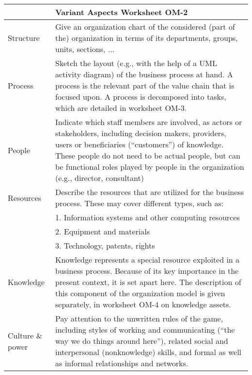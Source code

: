 \begin{tabular}%
       {|>{\colleft}p{3cm}%
        |>{\colleft}p{8.5cm}|}
\hline
{\bf Organization Model} &
   {\bf Variant Aspects Worksheet OM-2} \\
\hline
\hline
\sc Structure &
   {\rm
   Give an organization chart of the considered (part of the) organization
   in terms of its departments, groups, units, sections, ...
   } \\
\hline
\sc Process &
   {\rm
   Sketch the layout (e.g., with the help of a UML activity diagram) 
   of the business
   process at hand. A process is the relevant part of the value
   chain that is focused upon. A process is
   decomposed into tasks, which are detailed in worksheet OM-3.
   } \\
\hline
\sc People &
   {\rm
   Indicate which staff members are involved, as actors or
   stakeholders, including decision makers, providers, users or
   beneficiaries (``customers'') of knowledge. These people do not need
   to be actual people, but can be functional roles played by people in
   the organization (e.g., director, consultant)
   } \\
\hline
\sc Resources &
   {\rm
   Describe the resources that are utilized for the business
   process. These may cover different types, such as:
   } \\
 & {\rm 1. Information systems and other computing resources} \\
 & {\rm 2. Equipment and materials} \\
 & {\rm 3. Technology, patents, rights} \\
\hline
\sc Knowledge &
   {\rm
   Knowledge represents a special resource exploited in a business
   process. Because of its key importance in the present context, it
   is set apart here. The description of this component of the
   organization model is given separately, in worksheet OM-4 on
   knowledge assets.
   } \\
\hline
\sc Culture \& power &
   {\rm
   Pay attention to the unwritten rules of the game,
   including styles of working and communicating (``the way we do
   things around here''), related social and interpersonal
   (nonknowledge) skills, and formal as well as informal    
   relationships and networks.
   } \\
\hline
\end{tabular}
